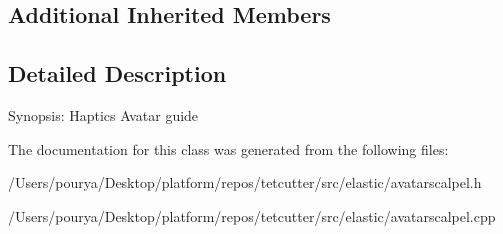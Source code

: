 \subsection*{Additional Inherited Members}


\subsection{Detailed Description}
Synopsis\+: Haptics Avatar guide 

The documentation for this class was generated from the following files\+:\begin{DoxyCompactItemize}
\item 
/\+Users/pourya/\+Desktop/platform/repos/tetcutter/src/elastic/avatarscalpel.\+h\item 
/\+Users/pourya/\+Desktop/platform/repos/tetcutter/src/elastic/avatarscalpel.\+cpp\end{DoxyCompactItemize}
